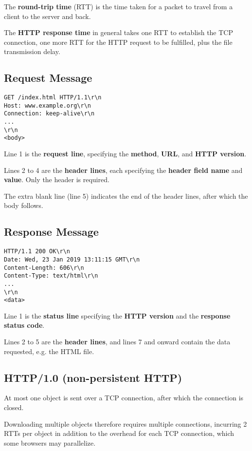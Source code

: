 The \textbf{round-trip time} (RTT) is the time taken for a packet to travel from a client to the server and back.

The \textbf{HTTP response time} in general takes one RTT to establish the TCP connection, one more RTT for the
HTTP request to be fulfilled, plus the file transmission delay.

\subsection{Request Message}
\begin{lstlisting}
GET /index.html HTTP/1.1\r\n
Host: www.example.org\r\n
Connection: keep-alive\r\n
...
\r\n
<body>
\end{lstlisting}

Line 1 is the \textbf{request line}, specifying the \textbf{method}, \textbf{URL}, and \textbf{HTTP version}.

Lines 2 to 4 are the \textbf{header lines}, each specifying the \textbf{header field name} and \textbf{value}.
Only the  header is required.

The extra blank line (line 5) indicates the end of the header lines, after which the body follows.

\subsection{Response Message}
\begin{lstlisting}
HTTP/1.1 200 OK\r\n
Date: Wed, 23 Jan 2019 13:11:15 GMT\r\n
Content-Length: 606\r\n
Content-Type: text/html\r\n
...
\r\n
<data>
\end{lstlisting}

Line 1 is the \textbf{status line} specifying the \textbf{HTTP version} and the \textbf{response status code}.

Lines 2 to 5 are the \textbf{header lines}, and lines 7 and onward contain the data requested, e.g. the HTML file.

\subsection{HTTP/1.0 (non-persistent HTTP)}
At most one object is sent over a TCP connection, after which the connection is closed.

Downloading multiple objects therefore requires multiple connections, incurring 2 RTTs per object in addition to the overhead for each TCP
connection, which some browsers may parallelize.

